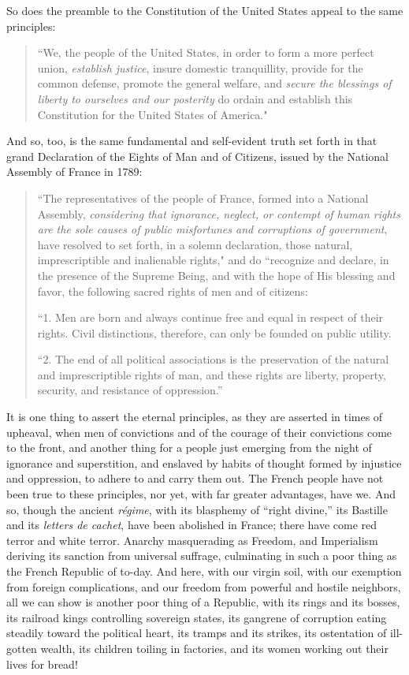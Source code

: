 \documentclass{book}
\begin{document}
So does the preamble to the Constitution of the United States appeal to the same principles:

\begin{quotation}
	“We, the people of the United States, in order to form a more perfect union, \emph{establish justice}, insure domestic tranquillity, provide for the common defense, promote the general welfare, and \emph{secure the blessings of liberty to ourselves and our posterity} do ordain and establish this Constitution for the United States of America."
\end{quotation}

And so, too, is the same fundamental and self-evident truth set forth in that grand Declaration of the Eights of Man and of Citizens, issued by the National Assembly of France in 1789:

\begin{quotation}
	“The representatives of the people of France, formed into a National Assembly, \emph{considering that ignorance, neglect, or contempt of human rights are the sole causes of public misfortunes and corruptions of government}, have resolved to set forth, in a solemn declaration, those natural, imprescriptible and inalienable rights," and do “recognize and declare, in the presence of the Supreme Being, and with the hope of His blessing and favor, the following sacred rights of men and of citizens:

	“1. Men are born and always continue free and equal in respect of their rights. Civil distinctions, therefore, can only be founded on public utility.

	“2. The end of all political associations is the preservation of the natural and imprescriptible rights of man, and these rights are liberty, property, security, and resistance of oppression.”
\end{quotation}

It is one thing to assert the eternal principles, as they are asserted in times of upheaval, when men of convictions and of the courage of their convictions come to the front, and another thing for a people just emerging from the night of ignorance and superstition, and enslaved by habits of thought formed by injustice and oppression, to adhere to and carry them out. The French people have not been true to these principles, nor yet, with far greater advantages, have we. And so, though the ancient \emph{régime}, with its blasphemy of “right divine,” its Bastille and its \emph{letters de cachet}, have been abolished in France; there have come red terror and white terror. Anarchy masquerading as Freedom, and Imperialism deriving its sanction from universal suffrage, culminating in such a poor thing as the French Republic of to-day. And here, with our virgin soil, with our exemption from foreign complications, and our freedom from powerful and hostile neighbors, all we can show is another poor thing of a Republic, with its rings and its bosses, its railroad kings controlling sovereign states, its gangrene of corruption eating steadily toward the political heart, its tramps and its strikes, its ostentation of ill-gotten wealth, its children toiling in factories, and its women working out their lives for bread!
\end{document}
